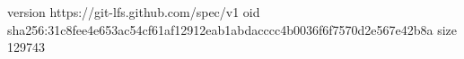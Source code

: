 version https://git-lfs.github.com/spec/v1
oid sha256:31c8fee4e653ac54cf61af12912eab1abdacccc4b0036f6f7570d2e567e42b8a
size 129743
